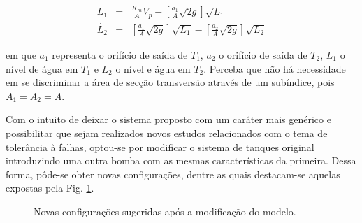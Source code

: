 \begin{eqnarray}
\dot{L_1} & = & \frac{K_m}{A}V_p -
                \left[\frac{a_1}{A}\sqrt{2g}\right]\sqrt{L_1}
                \label{eq:l1_ponto_tmp}\\
\dot{L_2} & = & \left[\frac{a_1}{A}\sqrt{2g}\right]\sqrt{L_1} -
                \left[\frac{a_2}{A}\sqrt{2g}\right]\sqrt{L_2}
                \label{eq:l2_ponto_tmp}
\end{eqnarray}

\noindent em que $a_1$ representa o orifício de saída de $T_1$, $a_2$ o orifício
de saída de $T_2$, $L_1$ o nível de água em $T_1$ e $L_2$ o nível e água em
$T_2$. Perceba que não há necessidade em se discriminar a área de secção
transversão através de um subíndice, pois $A_1 = A_2 = A$.

Com o intuito de deixar o sistema proposto com um caráter mais genérico e
possibilitar que sejam realizados novos estudos relacionados com o tema de
tolerância à falhas, optou-se por modificar o sistema de tanques original
introduzindo uma outra bomba com as mesmas características da primeira. Dessa
forma, pôde-se obter novas configurações, dentre as quais destacam-se aquelas
expostas pela Fig. \ref{fig:novas_config}.

\begin{figure}[htb]
\centering
{}
\caption{Novas configurações sugeridas após a modificação do modelo.}
\label{fig:novas_config}
\end{figure}

